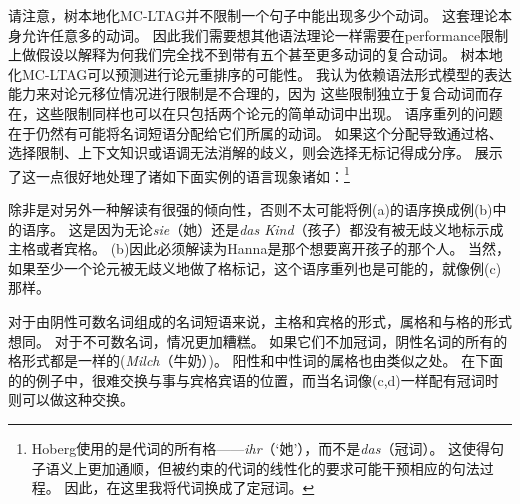 请注意，树本地化MC-LTAG并不限制一个句子中能出现多少个动词。
这套理论本身允许任意多的动词。
因此我们需要想其他语法理论一样需要在performance限制上做假设以解释为何我们完全找不到带有五个甚至更多动词的复合动词。
树本地化MC-LTAG可以预测进行论元重排序的可能性。
我认为依赖语法形式模型的表达能力来对论元移位情况进行限制是不合理的，因为
这些限制独立于复合动词而存在，这些限制同样也可以在只包括两个论元的简单动词中出现。
语序重列的问题在于仍然有可能将名词短语分配给它们所属的动词。
如果这个分配导致通过格、选择限制、上下文知识或语调无法消解的歧义，则会选择无标记得成分序。
\citet*[]{Hoberg81a}展示了这一点很好地处理了诸如下面实例的语言现象诸如：\footnote{        
Hoberg使用的是代词的所有格——\emph{ihr}（`她'），而不是\emph{das}（冠词）。
这使得句子语义上更加通顺，但被约束的代词的线性化的要求可能干预相应的句法过程。
因此，在这里我将代词换成了定冠词。
}
\eal
\judgewidth{\#}
\zl
\pagebreak

\noindent
除非是对另外一种解读有很强的倾向性，否则不太可能将例(a)的语序换成例(b)中的语序。
这是因为无论\emph{sie}（她）还是\emph{das Kind}（孩子）都没有被无歧义地标示成主格或者宾格。
(b)因此必须解读为Hanna是那个想要离开孩子的那个人。
当然，如果至少一个论元被无歧义地做了格标记，这个语序重列也是可能的，就像例(c)那样。

对于由阴性可数名词组成的名词短语来说，主格和宾格的形式，属格和与格的形式想同。
对于不可数名词，情况更加糟糕。
如果它们不加冠词，阴性名词的所有的格形式都是一样的(\eg \emph{Milch}（牛奶）)。
阳性和中性词的属格也由类似之处。
在下面的\citet[]{Wegener85b}的例子中，很难交换与事与宾格宾语的位置，而当名词像(c,d)一样配有冠词时则可以做这种交换。

